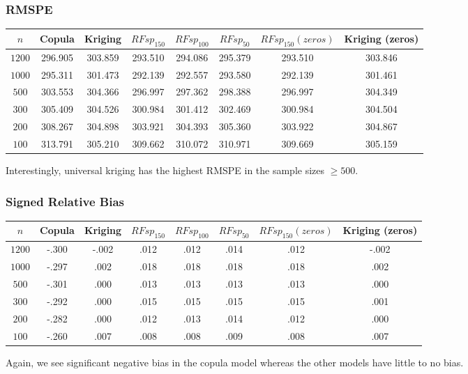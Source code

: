 \documentclass{article}
\begin{document}
\subsubsection{RMSPE}
\begin{center}
\begin{tabular}{|| c | c c c c c c c ||}
\hline
$n$ & Copula & Kriging & $RFsp_{150}$ & $RFsp_{100}$ & $RFsp_{50}$ & $RFsp_{150}(zeros)$ & Kriging (zeros) \\ [.5ex] 
\hline\hline
	$1200$ & 296.905 & 303.859 & 293.510 & 294.086 & 295.379 & 293.510 & 303.846 \\
	$1000$ & 295.311 & 301.473 & 292.139 & 292.557 & 293.580 & 292.139 & 301.461 \\
	$500$ & 303.553 & 304.366 & 296.997 & 297.362 & 298.388 & 296.997 & 304.349 \\
	$300$ & 305.409 & 304.526 & 300.984 & 301.412 & 302.469 & 300.984 & 304.504 \\
	$200$ & 308.267 & 304.898 & 303.921 & 304.393 & 305.360 & 303.922 & 304.867 \\
	$100$ & 313.791 & 305.210 & 309.662 & 310.072 & 310.971 & 309.669 & 305.159 \\ [.5ex] 
\hline
\end{tabular}
\end{center}
Interestingly, universal kriging has the highest RMSPE in the sample sizes $\geq 500$.

\subsubsection{Signed Relative Bias}
\begin{center}
\begin{tabular}{|| c | c c c c c c c ||}
\hline
$n$ & Copula & Kriging & $RFsp_{150}$ & $RFsp_{100}$ & $RFsp_{50}$ & $RFsp_{150}(zeros)$ & Kriging (zeros) \\ [.5ex] 
\hline\hline
	$1200$ & -.300 & -.002 & .012 & .012 & .014 & .012 & -.002 \\
	$1000$ & -.297 & .002 & .018 & .018 & .018 & .018 & .002 \\
	$500$ & -.301 & .000 & .013 & .013 & .013 & .013 & .000 \\
	$300$ & -.292 & .000 & .015 & .015 & .015 & .015 & .001 \\
	$200$ & -.282 & .000 & .012 & .013 & .014 & .012 & .000 \\
	$100$ & -.260 & .007 & .008 & .008 & .009 & .008 & .007 \\ [.5ex] 
\hline
\end{tabular}
\end{center}
Again, we see significant negative bias in the copula model whereas the other models have little to no bias.
\end{document}
